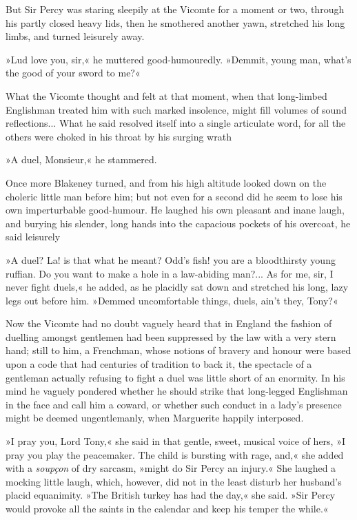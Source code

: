 But Sir Percy was staring sleepily at the Vicomte for a moment or two, through his partly closed heavy lids, then he smothered another yawn, stretched his long limbs, and turned leisurely away.

»Lud love you, sir,« he muttered good-humouredly. »Demmit, young man, what's the good of your sword to me?«

What the Vicomte thought and felt at that moment, when that long-limbed Englishman treated him with such marked insolence, might fill volumes of sound reflections... What he said resolved itself into a single articulate word, for all the others were choked in his throat by his surging wrath\longdash


»A duel, Monsieur,« he stammered.

Once more Blakeney turned, and from his high altitude looked down on the choleric little man before him; but not even for a second did he seem to lose his own imperturbable good-humour. He laughed his own pleasant and inane laugh, and burying his slender, long hands into the capacious pockets of his overcoat, he said leisurely\longdash


»A duel? La! is that what he meant? Odd's fish! you are a bloodthirsty young ruffian. Do you want to make a hole in a law-abiding man?... As for me, sir, I never fight duels,« he added, as he placidly sat down and stretched his long, lazy legs out before him. »Demmed uncomfortable things, duels, ain't they, Tony?«

Now the Vicomte had no doubt vaguely heard that in England the fashion of duelling amongst gentlemen had been suppressed by the law with a very stern hand; still to him, a Frenchman, whose notions of bravery and honour were based upon a code that had centuries of tradition to back it, the spectacle of a gentleman actually refusing to fight a duel was little short of an enormity. In his mind he vaguely pondered whether he should strike that long-legged Englishman in the face and call him a coward, or whether such conduct in a lady's presence might be deemed ungentlemanly, when Marguerite happily interposed.

»I pray you, Lord Tony,« she said in that gentle, sweet, musical voice of hers, »I pray you play the peacemaker. The child is bursting with rage, and,« she added with a \textit{soupçon} of dry sarcasm, »might do Sir Percy an injury.« She laughed a mocking little laugh, which, however, did not in the least disturb her husband's placid equanimity. »The British turkey has had the day,« she said. »Sir Percy would provoke all the saints in the calendar and keep his temper the while.«

